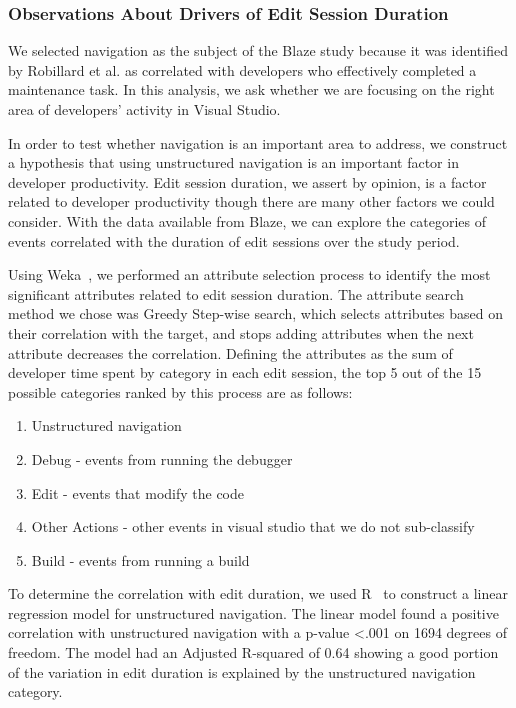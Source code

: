 \documentclass{sig-alternate}
\begin{document}
\subsubsection{Observations About Drivers of Edit Session Duration}
\label{sec:driversOfEditSession}
We selected navigation as the subject of the Blaze study because it was identified by Robillard et al.\cite{wbsnipes:Robillard2004How} as correlated with developers who effectively completed a maintenance task.    In this analysis, we ask whether we are focusing on the right area of developers' activity in Visual Studio.

In order to test whether navigation is an important area to address, we construct a hypothesis that using unstructured navigation is an important factor in developer productivity.  Edit session duration, we assert by opinion, is a factor related to developer productivity though there are many other factors we could consider.  With the data available from Blaze, we can explore the categories of events correlated with the duration of edit sessions over the study period.  

Using Weka~\cite{Hall2009WEKA}, we performed an attribute selection process to identify the most significant attributes related to edit session duration.  The attribute search method we chose was Greedy Step-wise search, which selects attributes based on their correlation with the target, and stops adding attributes when the next attribute decreases the correlation.    Defining the attributes as the sum of developer time spent by category in each edit session, the top 5 out of the 15 possible categories ranked by this process are as follows:
\begin{enumerate}[itemsep=0mm]
\item Unstructured navigation
\item Debug - events from running the debugger
\item Edit - events that modify the code
\item Other Actions - other events in visual studio that we do not sub-classify
\item Build - events from running a build
\end{enumerate}

To determine the correlation with edit duration, we used R~\cite{Rcitation} to construct a linear regression model for unstructured navigation.  The linear model found a positive correlation with unstructured navigation with a p-value <.001 on 1694 degrees of freedom.  The model had an Adjusted R-squared of 0.64 showing a good portion of the variation in edit duration is explained by the unstructured navigation category. 
\end{document}
